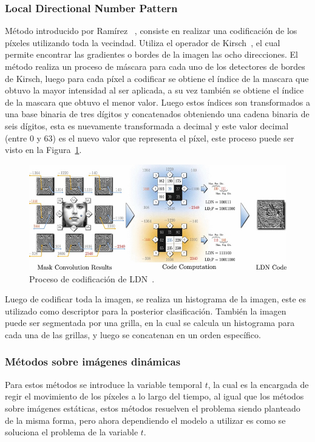 		\subsubsection{Local Directional Number Pattern}
		\label{sec:ldn}
		Método introducido por Ramírez \etal~\cite{RamirezRivera2013}, consiste en realizar una codificación de los píxeles utilizando toda la vecindad. Utiliza el operador de Kirsch~\cite{Kirsch1971}, el cual permite encontrar las gradientes o bordes de la imagen las ocho direcciones. El método realiza un proceso de máscara para cada uno de los detectores de bordes de Kirsch, luego para cada píxel a codificar se obtiene el índice de la mascara que obtuvo la mayor intensidad al ser aplicada, a su vez también se obtiene el índice de la mascara que obtuvo el menor valor. Luego estos índices son transformados a una base binaria de tres dígitos y concatenados obteniendo una cadena binaria de seis dígitos, esta es nuevamente transformada a decimal y este valor decimal (entre $0$ y $63$) es el nuevo valor que representa el píxel, este proceso puede ser visto en la Figura~\ref{art:fig:ldn}.
		
\begin{figure}[tb]
  \centering
   \includegraphics[width=1\textwidth]{Figuras/ldn.jpg}
  \caption{Proceso de codificación de LDN~\cite{RamirezRivera2013}.}
  \label{art:fig:ldn}
\end{figure}

		Luego de codificar toda la imagen, se realiza un histograma de la imagen, este es utilizado como descriptor para la posterior clasificación. También la imagen puede ser segmentada por una grilla, en la cual se calcula un histograma para cada una de las grillas, y luego se concatenan en un orden específico.

	\subsubsection{Métodos sobre imágenes dinámicas}	
	\label{sec:met_videos}
	Para estos métodos se introduce la variable temporal $t$, la cual es la encargada de regir el movimiento de los píxeles a lo largo del tiempo, al igual que los métodos sobre imágenes estáticas, estos métodos resuelven el problema siendo planteado de la misma forma, pero ahora dependiendo el modelo a utilizar es como se soluciona el problema de la variable $t$.

